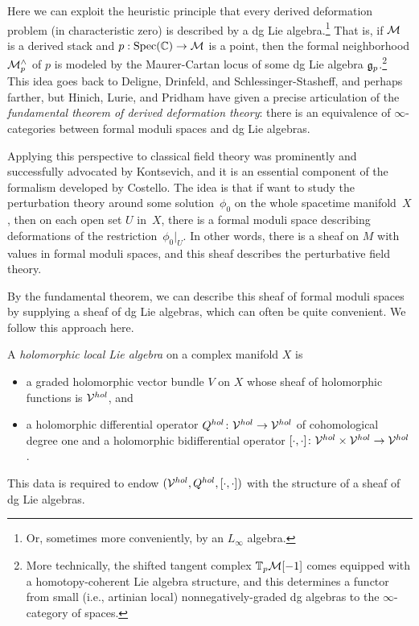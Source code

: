 \documentclass[11pt]{amsart}
\begin{document}
Here we can exploit the heuristic principle that every derived deformation problem (in characteristic zero) is described by a dg Lie algebra.\footnote{Or, sometimes more conveniently, by an $L_\infty$ algebra.}
That is, if $\mathcal M$ is a derived stack and $p: {\rm Spec}(\mathbb C) \to \mathcal M$ is a point, 
then the formal neighborhood $\mathcal M^\wedge_p$ of $p$ is modeled by the Maurer-Cartan locus of some dg Lie algebra $\mathfrak g_p$.\footnote{More technically, the shifted tangent complex $\mathbb T_p \mathcal M[-1]$ comes equipped with a homotopy-coherent Lie algebra structure, 
and this determines a functor from small (i.e., artinian local) nonnegatively-graded dg algebras to the $\infty$-category of spaces.}
This idea goes back to Deligne, Drinfeld, and Schlessinger-Stasheff, and perhaps farther, 
but Hinich, Lurie, and Pridham have given a precise articulation of the {\em fundamental theorem of derived deformation theory}:
there is an equivalence of $\infty$-categories between formal moduli spaces and dg Lie algebras.

Applying this perspective to classical field theory was prominently and successfully advocated by Kontsevich, 
and it is an essential component of the formalism developed by Costello.
The idea is that if want to study the perturbation theory around some solution~$\phi_0$ on the whole spacetime manifold~$X$,
then on each open set $U$ in~$X$,
there is a formal moduli space describing deformations of the restriction~$\phi_0|_U$.
In other words, there is a sheaf on $M$ with values in formal moduli spaces,
and this sheaf describes the perturbative field theory.

By the fundamental theorem, we can describe this sheaf of formal moduli spaces by supplying a sheaf of dg Lie algebras, which can often be quite convenient.
We follow this approach here.

\begin{dfn} 
A {\em holomorphic local Lie algebra} on a complex manifold $X$ is
\begin{itemize}
\item a graded holomorphic vector bundle $V$ on $X$ whose sheaf of holomorphic functions is $\mathcal V^{hol}$, and
\item a holomorphic differential operator $Q^{hol} \colon \mathcal V^{hol} \to \mathcal V^{hol}$ of cohomological degree one and a holomorphic bidifferential operator $[\cdot,\cdot] \colon \mathcal V^{hol} \times \mathcal V^{hol} \to \mathcal V^{hol}$. 
\end{itemize}
This data is required to endow $(\mathcal V^{hol}, Q^{hol}, [\cdot,\cdot])$ with the structure of a sheaf of dg Lie algebras.
\end{dfn}
\end{document}
